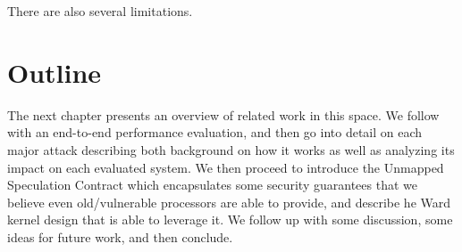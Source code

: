 \begin{itemize}
\end{itemize}

There are also several limitations.


\section{Outline}
The next chapter presents an overview of related work in this space.
We follow with an end-to-end performance evaluation, and then go into detail on each major attack describing both background on how it works as well as analyzing its impact on each evaluated system.
We then proceed to introduce the Unmapped Speculation Contract which encapsulates some security guarantees that we believe even old/vulnerable processors are able to provide, and describe he Ward kernel design that is able to leverage it.
We follow up with some discussion, some ideas for future work, and then conclude.
